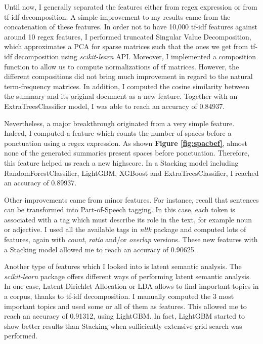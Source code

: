 \documentclass{article}
\begin{document}
\begin{multicols}{2}
Until now, I generally separated the features either from regex expression or from tf-idf decomposition. A simple improvement to my results came from the concatenation of these features. In order not to have 10,000 tf-idf features against around 10 regex features, I performed truncated Singular Value Decomposition, which approximates a PCA for sparse matrices such that the ones we get from tf-idf decomposition using \textit{scikit-learn} API. Moreover, I implemented a composition function to allow us to compute normalizations\cite{tfidfcomp} of tf matrices. However, the different compositions did not bring much improvement in regard to the natural term-frequency matrices. In addition, I computed the cosine similarity between the summary and its original document as a new feature. Together with an ExtraTreesClassifier model, I was able to reach an accuracy of 0.84937. 

Nevertheless, a major breakthrough originated from a very simple feature. Indeed, I computed a feature which counts the number of spaces before a ponctuation using a regex expression. As shown \textbf{Figure \ref{fig:spacbef}}, almost none of the generated summaries present spaces before ponctuation. Therefore, this feature helped us reach a new highscore. In a Stacking model including RandomForestClassifier, LightGBM, XGBoost and ExtraTreesClassifier, I reached an accuracy of 0.89937.

Other improvements came from minor features. For instance, recall that sentences can be transformed into Part-of-Speech tagging. In this case, each token is associated with a tag which must describe its role in the text, for example noun or adjective. I used all the available tags in \textit{nltk} package and computed lots of features, again with \textit{count}, \textit{ratio} and/or \textit{overlap} versions. These new features with a Stacking model allowed me to reach an accuracy of 0.90625.

Another type of features which I looked into is latent semantic analysis. The \textit{scikit-learn} package offers different ways of performing latent semantic analysis. In one case, Latent Dirichlet Allocation or LDA allows to find important topics in a corpus, thanks to tf-idf decomposition. I manually computed the 3 most important topics and used some or all of them as features. This allowed me to reach an accuracy of 0.91312, using LightGBM. In fact, LightGBM started to show better results than Stacking when sufficiently extensive grid search was performed. 


\end{multicols}
\end{document}
